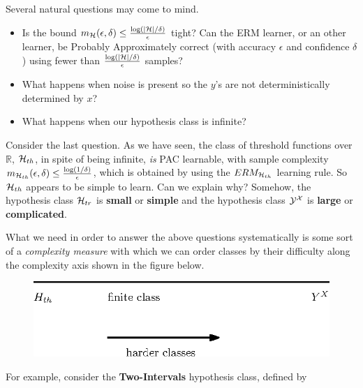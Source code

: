 {%
Several natural questions may come to mind.

\begin{itemize}
	\item Is the bound $m_{\mathcal{H}}(\epsilon,\delta) \le \frac{\log(|\mathcal{H}|/\delta)}{\epsilon}$ tight? Can the ERM learner, or an other learner, be Probably Approximately correct (with accuracy $\epsilon$ and confidence $\delta$) using fewer than 
	$\frac{\log(|\mathcal{H}|/\delta)}{\epsilon}$ samples?
	\item What happens when noise is present so the $y$'s are not deterministically determined by $x$?
	\item What happens when our  hypothesis class is infinite?
\end{itemize}

Consider the last question. As we have seen,  the  class of threshold functions
over $\mathbb{R}$,  $\mathcal{H}_{th}$, in spite of being infinite, \textit{is}  PAC
learnable, with sample complexity $m_{\mathcal{H}_{th}}(\epsilon,\delta)
\le\frac{\log(1/\delta)}{\epsilon}$, which is obtained by using the
$ERM_{\mathcal{H}_{th}}$ learning rule. So  $\mathcal{H}_{th}$ appears to be simple to learn.
Can we explain why? Somehow, the hypothesis class $\mathcal{H}_{tr}$ is {\bf small} or
{\bf simple} and the hypothesis class $\mathcal{Y} ^{\mathcal{X}}$ is {\bf large} or {\bf complicated}. 

What we need in order to answer the above questions systematically is some sort of a \textit{complexity measure} with which we can order classes by their difficulty along the complexity axis shown in the figure below.

\begin{figure}[h!]
	\centering
	\includegraphics[scale=0.6]{chapters/pac/figures/complexity_measure.eps}
\end{figure}

For example, consider the \textbf{Two-Intervals} hypothesis class, defined by

}
